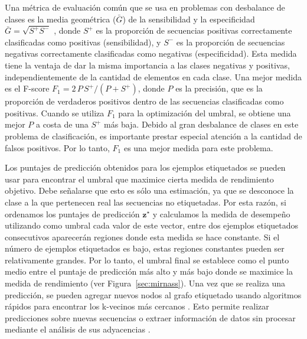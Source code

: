 Una métrica de evaluación común que se usa en problemas con desbalance de clases es la media geométrica ($ \bar {G} $) de la sensibilidad y la
especificidad $ \bar {G} = \sqrt {S ^ {+} S ^ {-} } $ \citep{batuwita2009micropred, gudys2013huntmi}, donde $ S ^ {+} $ es la proporción de secuencias
positivas correctamente clasificadas como positivas (sensibilidad), y $ S ^ {-} $ es la proporción de secuencias negativas correctamente clasificadas como
negativas (especificidad). Esta medida tiene la ventaja de dar la misma importancia a las clases negativas y positivas, independientemente de la cantidad de
elementos en cada clase. Una mejor medida es el \mbox{F-score} $ F_ {1} = 2 \, P \, S ^ {+} / (P + S ^ {+}) $, donde $ P $ es la precisión, que es la
proporción de verdaderos positivos dentro de las secuencias clasificadas como positivas. Cuando se utiliza $ F_ {1} $ para la optimización del umbral, se
obtiene una mejor $ P $ a costa de una $ S ^ {+} $ más baja. Debido al gran desbalance de clases en este problema de clasificación, es importante prestar
especial atención a la cantidad de falsos positivos. Por lo tanto, $F_{1}$ es una mejor medida para este problema.

Los puntajes de predicción obtenidos para los ejemplos etiquetados se pueden usar para encontrar el umbral que maximice cierta medida de rendimiento objetivo.
Debe señalarse que esto es sólo una estimación, ya que se desconoce la clase a la que pertenecen real las secuencias no etiquetadas. Por esta razón, si
ordenamos los puntajes de predicción $ \mathbf {z} ^ \star $ y calculamos la medida de desempeño utilizando como umbral cada valor de este vector,  entre dos
ejemplos etiquetados consecutivos aparecerán regiones donde esta medida se hace constante. Si el número de ejemplos etiquetados es bajo, estas regiones
constantes pueden ser relativamente grandes. Por lo tanto, el umbral final se establece como el punto medio entre el puntaje de predicción más alto y más
bajo  donde se maximice la medida de rendimiento (ver Figura~\ref{sec:mirnass}). Una vez que se realiza una predicción, se pueden agregar nuevos
nodos al grafo etiquetado usando algoritmos rápidos para encontrar los k-vecinos más cercanos \citep{malkov2014approximate}. Esto permite realizar
predicciones sobre nuevas secuencias o extraer información de datos sin procesar mediante el análisis de sus adyacencias \citep{chapelle2006semi}.

